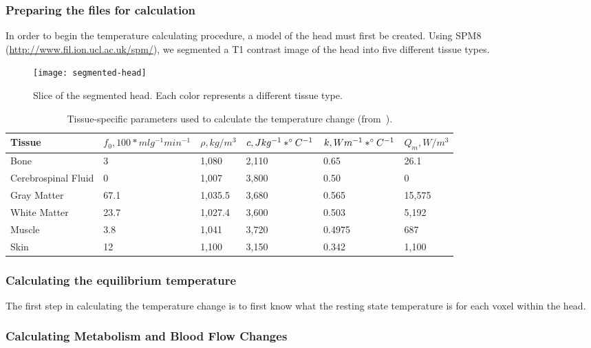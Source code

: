     \subsubsection{Preparing the files for calculation}
  In order to begin the temperature calculating procedure, a model of the head must first be created.  Using SPM8 (\url{http://www.fil.ion.ucl.ac.uk/spm/}), we segmented a T1 contrast image of the head into five different tissue types.  
  \begin{figure}[bht] 
    \centering \hspace*{20px} 
  	\texttt{[image: segmented-head]} 
  	\caption{\label{fig:segmented} Slice of the segmented head. Each color represents a different tissue type.} 
  \end{figure}
  \begin{table*}[t] 
    \caption{\label{tab:tissues} Tissue-specific parameters used to calculate the temperature change (from~\citet{collins}).} 
    \vspace{10pt}
  		\begin{tabular*}{\linewidth}{llllll} 
  		  \toprule
  		  Tissue & $f_0, 100*ml g^{-1} min^{-1}$ & $\rho, kg/m^{3}$ & $c, J kg^{-1}*^\circ C^{-1}$ & $k, W m^{-1}*^\circ C^{-1}$ & $Q_{m}, W/m^{3}$ \\
  		  \midrule
  			Bone & 3 & 1,080 & 2,110 & 0.65 & 26.1 \\
  			Cerebrospinal Fluid & 0 & 1,007 & 3,800 & 0.50 & 0 \\
  			Gray Matter & 67.1 & 1,035.5 & 3,680 & 0.565 & 15,575 \\
  			White Matter & 23.7 & 1,027.4 & 3,600 & 0.503 & 5,192 \\
  			Muscle & 3.8 & 1,041 & 3,720 & 0.4975 & 687 \\
  			Skin & 12 & 1,100 & 3,150 & 0.342 & 1,100 \\
  			\bottomrule
  		\end{tabular*}
  \end{table*}
    \subsubsection{Calculating the equilibrium temperature}
  The first step in calculating the temperature change is to first know what the resting state temperature is for each voxel within the head.  
  
    \subsubsection{Calculating Metabolism and Blood Flow Changes}
    \label{sss:calcmf}

